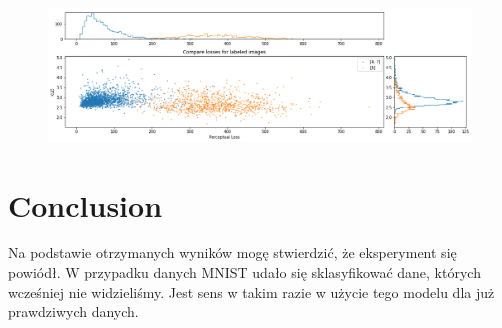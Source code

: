 \begin{figure}[h!]
    \centering
    \includegraphics[width=1.0\textwidth]{images/dfc_mnist_compare}
    \caption{}
    \label{fig:dfc_mnist_compare}
\end{figure}

\section{Conclusion}

Na podstawie otrzymanych wyników mogę stwierdzić, że eksperyment się powiódł. W przypadku danych MNIST udało się sklasyfikować dane, których wcześniej nie widzieliśmy. Jest sens w takim razie w użycie tego modelu dla już prawdziwych danych.
